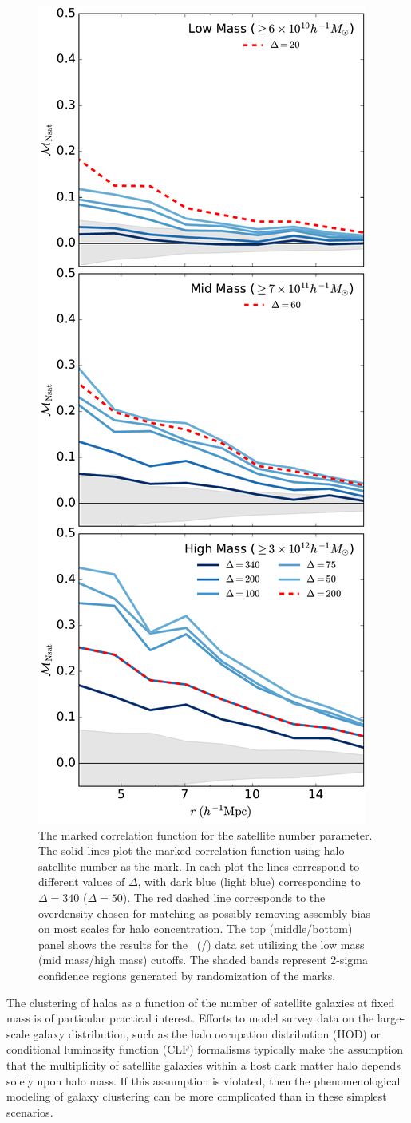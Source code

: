 \documentclass[usenatbib,fleqn]{mnras}
\begin{document}
\begin{figure}
	\centering
	\includegraphics[width=.4\textwidth]{all_mcf_nsat.pdf}
	\caption{
The marked correlation function for the satellite number parameter. The solid lines plot the marked correlation function using halo satellite number as the mark. In each plot the lines correspond to different values of $\Delta$, with dark blue (light blue) corresponding to $\Delta = 340$ ($\Delta = 50$). The red dashed line corresponds to the overdensity chosen for matching as possibly removing assembly bias on most scales for halo concentration. The top (middle/bottom) panel shows the results for the
\simA \ (\simB /\simC) data set utilizing the low mass (mid mass/high mass) cutoffs. The shaded bands represent 2-sigma confidence regions generated by randomization of the marks.}
	\label{fig:cc_mcf_nsat}
\end{figure}


The clustering of halos as a function of the number of satellite galaxies at fixed mass is of 
particular practical interest. Efforts to model survey data on the large-scale galaxy distribution, 
such as the halo occupation distribution (HOD) or conditional luminosity function (CLF) formalisms 
typically make the assumption that the multiplicity of satellite galaxies within a host dark matter 
halo depends solely upon halo mass. If this assumption is violated, then the phenomenological 
modeling of galaxy clustering can be more complicated than in these simplest scenarios.
\end{document}
